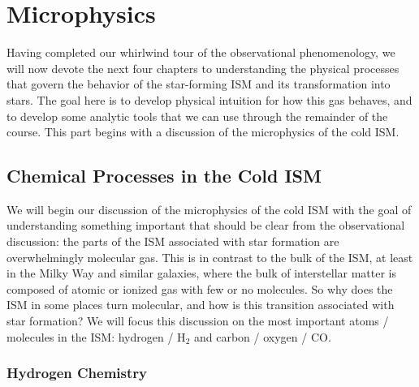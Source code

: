 \chapter{Microphysics}
\label{ch:microphysics}


Having completed our whirlwind tour of the observational phenomenology, we will now devote the next four chapters to understanding the physical processes that govern the behavior of the star-forming ISM and its transformation into stars. The goal here is to develop physical intuition for how this gas behaves, and to develop some analytic tools that we can use through the remainder of the course. This part begins with a discussion of the microphysics of the cold ISM.

\section{Chemical Processes in the Cold ISM}

We will begin our discussion of the microphysics of the cold ISM with the goal of understanding something important that should be clear from the observational discussion: the parts of the ISM associated with star formation are overwhelmingly molecular gas. This is in contrast to the bulk of the ISM, at least in the Milky Way and similar galaxies, where the bulk of interstellar matter is composed of atomic or ionized gas with few or no molecules. So why does the ISM in some places turn molecular, and how is this transition associated with star formation? We will focus this discussion on the most important atoms / molecules in the ISM: hydrogen / H$_2$ and carbon / oxygen / CO.

\subsection{Hydrogen Chemistry}

